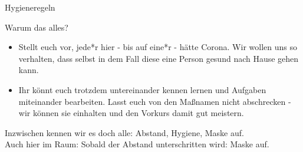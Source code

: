 \begin{frame}[fragile]{Hygieneregeln}
	\begin{alertblock}{Warum das alles?}
		\begin{itemize}
			\item Stellt euch vor, jede*r hier - bis auf eine*r - hätte Corona. Wir wollen uns so verhalten, dass selbst in dem Fall diese eine Person gesund nach Hause gehen kann.
			\item Ihr könnt euch trotzdem untereinander kennen lernen und Aufgaben miteinander bearbeiten. Lasst euch von den Maßnamen nicht abschrecken - wir können sie einhalten und den Vorkurs damit gut meistern.
		\end{itemize}
	\alert{Inzwischen kennen wir es doch alle: Abstand, Hygiene, Maske auf.\\
	Auch hier im Raum: Sobald der Abstand unterschritten wird: Maske auf.}
	\end{alertblock}
\end{frame}
